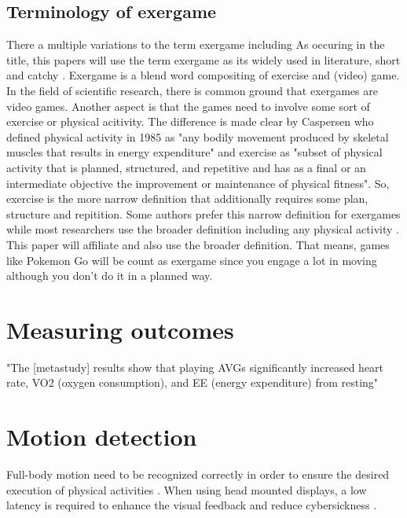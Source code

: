 \section{Terminology of exergame}
There a multiple variations to the term exergame including 
As occuring in the title, this papers will use the term exergame as its widely used in literature, short and catchy \cite{oh2010defining}. Exergame is a blend word compositing of exercise and (video) game. In the field of scientific research, there is common ground that exergames are video games. Another aspect is that the games need to involve some sort of exercise or physical acitivity. The difference is made clear by Caspersen who defined \cite{caspersen1985physical} physical activity in 1985 as "any bodily movement produced by skeletal muscles that results in energy expenditure" and exercise as "subset of physical activity that is planned, structured, and repetitive and has as a final or an intermediate objective the improvement or maintenance of physical fitness". So, exercise is the more narrow definition that additionally requires some plan, structure and repitition. Some authors prefer this narrow definition for exergames while most researchers use the broader definition including any physical activity \cite{oh2010defining}. This paper will affiliate and also use the broader definition. That means, games like Pokemon Go will be count as exergame since you engage a lot in moving although you don't do it in a planned way.



\chapter{Measuring outcomes}
"The [metastudy] results show that playing AVGs significantly increased heart rate, VO2 (oxygen consumption), and EE (energy expenditure) from resting" \cite{peng2011playing}


\chapter{Motion detection}
Full-body motion need to be recognized correctly in order to ensure the desired execution of physical activities \cite{casermanfull}.
When using head mounted displays, a low latency is required to enhance the visual feedback and reduce cybersickness \cite{casermanfull}.

